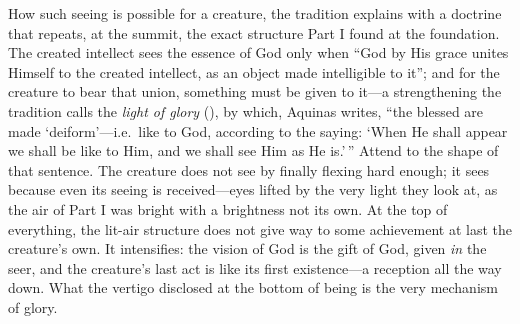 How such seeing is possible for a creature, the tradition explains with a doctrine that repeats, at the summit, the exact structure Part I found at the foundation. The created intellect sees the essence of God only when ``God by His grace unites Himself to the created intellect, as an object made intelligible to it''; and for the creature to bear that union, something must be given to it---a strengthening the tradition calls the \emph{light of glory} (), by which, Aquinas writes, ``the blessed are made `deiform'---i.e.\ like to God, according to the saying: `When He shall appear we shall be like to Him, and we shall see Him as He is.'\,'' Attend to the shape of that sentence. The creature does not see by finally flexing hard enough; it sees because even its seeing is received---eyes lifted by the very light they look at, as the air of Part I was bright with a brightness not its own. At the top of everything, the lit-air structure does not give way to some achievement at last the creature's own. It intensifies: the vision of God is the gift of God, given \emph{in} the seer, and the creature's last act is like its first existence---a reception all the way down. What the vertigo disclosed at the bottom of being is the very mechanism of glory.

